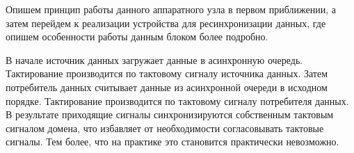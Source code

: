 Опишем принцип работы данного аппаратного узла в первом приближении, а затем перейдем к реализации устройства для ресинхронизации данных, где опишем особенности работы данным блоком более подробно.

 В начале источник данных загружает данные в асинхронную очередь. Тактирование производится по тактовому сигналу источника данных. Затем потребитель данных считывает данные из асинхронной очереди в исходном порядке. Тактирование производится по тактовому сигналу потребителя данных. 
 В результате приходящие сигналы синхронизируются собственным тактовым сигналом домена, что избавляет от необходимости согласовывать тактовые сигналы. Тем более, что на практике это становится практически невозможно. 




